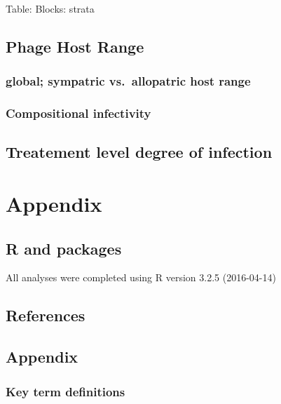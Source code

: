 \documentclass[]{article}
\begin{document}
Table: Blocks: strata

\newpage

\subsection{Phage Host Range}\label{phage-host-range}

\subsubsection{global; sympatric vs.~allopatric host
range}\label{global-sympatric-vs.allopatric-host-range}

\newpage

\subsubsection{Compositional
infectivity}\label{compositional-infectivity}

\newpage

\subsection{Treatement level degree of
infection}\label{treatement-level-degree-of-infection}

\newpage

\section{Appendix}\label{appendix}

\subsection{R and packages}\label{r-and-packages}

All analyses were completed using R version 3.2.5 (2016-04-14)

\newpage

\subsection{References}\label{references}

\newpage

\subsection{Appendix}\label{appendix-1}

\subsubsection{Key term definitions}\label{key-term-definitions}
\end{document}

